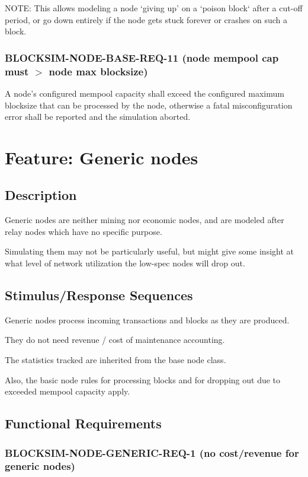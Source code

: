 \documentclass{scrreprt}
\begin{document}
NOTE: This allows modeling a node `giving up' on a `poison block` after a
cut-off period, or go down entirely if the node gets stuck forever or crashes
on such a block.


\subsubsection{BLOCKSIM-NODE-BASE-REQ-11 (node mempool cap must $>$ node max blocksize)}

A node's configured mempool capacity shall exceed the configured
maximum blocksize that can be processed by the node, otherwise a fatal
misconfiguration error shall be reported and the simulation aborted.



\section{Feature: Generic nodes}

\subsection{Description}

Generic nodes are neither mining nor economic nodes, and are modeled
after relay nodes which have no specific purpose.

Simulating them may not be particularly useful, but might give some
insight at what level of network utilization the low-spec nodes will
drop out.


\subsection{Stimulus/Response Sequences}

Generic nodes process incoming transactions and blocks as they are
produced.

They do not need revenue / cost of maintenance accounting.

The statistics tracked are inherited from the base node class.

Also, the basic node rules for processing blocks and for dropping out due to
exceeded mempool capacity apply.


\subsection{Functional Requirements}

\subsubsection{BLOCKSIM-NODE-GENERIC-REQ-1 (no cost/revenue for generic nodes)}
\end{document}
